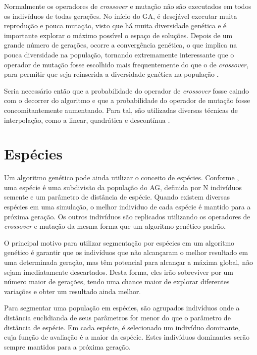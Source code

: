 \documentclass[12pt,oneside,a4paper,english,french,spanish,brazil,]{abntex2}
\begin{document}
Normalmente os operadores de \textit{crossover} e mutação não são executados em todos os indivíduos de todas gerações. No início do GA, é desejável executar muita reprodução e pouca mutação, visto que há muita diversidade genética e é importante explorar o máximo possível o espaço de soluções. Depois de um grande número de gerações, ocorre a convergência genética, o que implica na pouca diversidade na população, tornando extremamente interessante que o operador de mutação fosse escolhido mais frequentemente do que o de \textit{crossover}, para permitir que seja reinserida a diversidade genética na população \cite{linden:2008}.

Seria necessário então que a probabilidade do operador de \textit{crossover} fosse caindo com o decorrer do algoritmo e que a probabilidade do operador de mutação fosse concomitantemente aumentando. Para tal, são utilizadas diversas técnicas de interpolação, como a linear, quadrática e descontínua \cite{linden:2008}.

\section{Espécies}

Um algoritmo genético pode ainda utilizar o conceito de espécies. Conforme \citet{li:2002}, uma espécie é uma subdivisão da população do AG, definida por N indivíduos semente e um parâmetro de distância de espécie. Quando existem diversas espécies em uma simulação, o melhor indivíduo de cada espécie é mantido para a próxima geração. Os outros indivíduos são replicados utilizando os operadores de \textit{crossover} e mutação da mesma forma que um algoritmo genético padrão.

O principal motivo para utilizar segmentação por espécies em um algoritmo genético é garantir que os indivíduos que não alcançaram o melhor resultado em uma determinada geração, mas têm potencial para alcançar a máxima global, não sejam imediatamente descartados. Desta forma, eles irão sobreviver por um número maior de gerações, tendo uma chance maior de explorar diferentes variações e obter um resultado ainda melhor.

Para segmentar uma população em espécies, são agrupados indivíduos onde a distância euclidianda de seus parâmetros for menor do que o parâmetro de distância de espécie. Em cada espécie, é selecionado um indivíduo dominante, cuja função de avaliação é a maior da espécie. Estes indivíduos dominantes serão sempre mantidos para a próxima geração.
\end{document}
